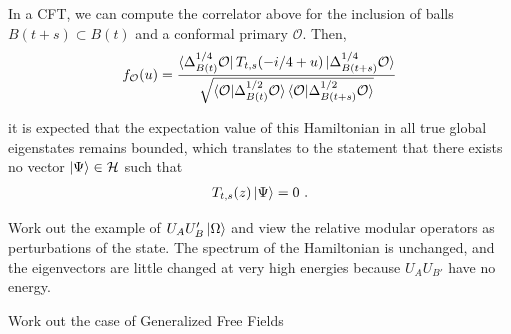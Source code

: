 \documentclass[a4paper,11pt]{article}
\theoremstyle{definition}
\newcommand{\lb}{\left(}
\newcommand{\rb}{\right)}
\newcommand{\mO}{\mathcal{O}}
\begin{document}
In a CFT, we can compute the correlator above for the inclusion of balls $B(t+s)\subset B(t)$ and a conformal primary $\mO$. Then,
\begin{eqnarray}
    f_\mO(u)=\frac{\bra{\Delta_{B(t)}^{1/4}\mO} T_{t,s}(-i/4+u)\ket{\Delta_{B(t+s)}^{1/4} \mO}}{\sqrt{\braket{\mO|\Delta_{B(t)}^{1/2}\mO}\braket{\mO|\Delta_{B(t+s)}^{1/2}\mO}}}
\end{eqnarray}


it is expected that the expectation value of this Hamiltonian in all true global eigenstates remains bounded, which translates to the statement that there exists no vector $\ket{\Psi}\in \mathcal{H}$ such that 
\begin{eqnarray}
    T_{t,s}(z)\ket{\Psi}=0\ .
\end{eqnarray}


Work out the example of $U_A U_B'\ket{\Omega}$ and view the relative modular operators as perturbations of the state. The spectrum of the Hamiltonian is unchanged, and the eigenvectors are little changed at very high energies because $U_AU_{B'}$ have no energy.

Work out the case of Generalized Free Fields








\end{document}
